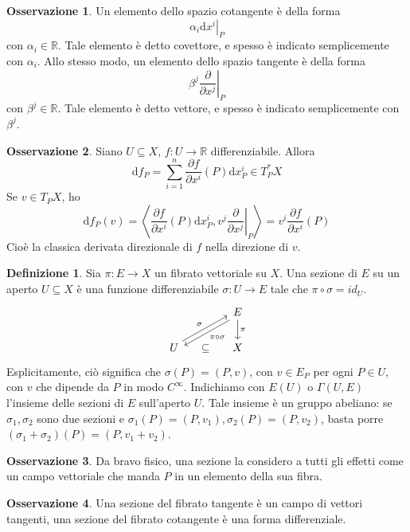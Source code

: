 \documentclass[a4paper,11pt]{article}
\theoremstyle{definition}
\newtheorem{osservazione}{Osservazione}[section]
\newtheorem{definizione}{Definizione}[section]
\theoremstyle{theorem}
\begin{document}
\begin{osservazione}
	Un elemento dello spazio cotangente è della forma
	\[\alpha_i\left.\mathrm{d}x^i\right|_P\]
	con $\alpha_i\in\mathbb{R}$. Tale elemento è detto covettore, e spesso è indicato semplicemente con $\alpha_i$. Allo stesso modo, un elemento dello spazio tangente è della forma
	\[\beta^j\left.\frac{\partial}{\partial x^j}\right|_P\]
	con $\beta^j\in\mathbb{R}$. Tale elemento è detto vettore, e spesso è indicato semplicemente con $\beta^j$.
\end{osservazione}
\begin{osservazione}
	Siano $U\subseteq X$, $f\colon U\to\mathbb{R}$ differenziabile. Allora
	\[\mathrm{d}f_P=\sum_{i=1}^{n}\frac{\partial f}{\partial x^i}(P)\mathrm{d}x^i_P\in T^*_PX\]
	Se $v\in T_PX$, ho
	\[\mathrm{d}f_P(v)=\left\langle\frac{\partial f}{\partial x^i}(P)\mathrm{d}x^i_P, v^j\left.\frac{\partial}{\partial x^j}\right|_P\right\rangle=v^i\frac{\partial f}{\partial x^i}(P)\]
	Cioè la classica derivata direzionale di $f$ nella direzione di $v$.
\end{osservazione}
\begin{definizione}
	Sia $\pi\colon E\to X$ un fibrato vettoriale su $X$. Una sezione di $E$ su un aperto $U\subseteq X$ è una funzione differenziabile $\sigma\colon U\to E$ tale che $\pi\circ\sigma=id_U$.
	\[\begin{tikzcd}[column sep=small]
	&& E\arrow[d,"\pi"]\arrow[dll, "\pi\circ\sigma",shift left=0.5ex]\\
	U \arrow[urr, "\sigma", shift left=0.5ex]& \subseteq & X
	\end{tikzcd}\]
	Esplicitamente, ciò significa che $\sigma(P)=(P,v)$, con $v\in E_P$ per ogni $P\in U$, con $v$ che dipende da $P$ in modo $C^\infty$. Indichiamo con $E(U)$ o $\Gamma(U,E)$ l'insieme delle sezioni di $E$ sull'aperto $U$. Tale insieme è un gruppo abeliano: se $\sigma_1,\sigma_2$ sono due sezioni e $\sigma_1(P)=(P,v_1),\sigma_2(P)=(P,v_2)$, basta porre $(\sigma_1+\sigma_2)(P)=(P,v_1+v_2)$.
\end{definizione}
\begin{osservazione}
	Da bravo fisico, una sezione la considero a tutti gli effetti come un campo vettoriale che manda $P$ in un elemento della sua fibra.
\end{osservazione}
\begin{osservazione}
	Una sezione del fibrato tangente è un campo di vettori tangenti, una sezione del fibrato cotangente è una forma differenziale.
\end{osservazione}
\newpage
\end{document}
